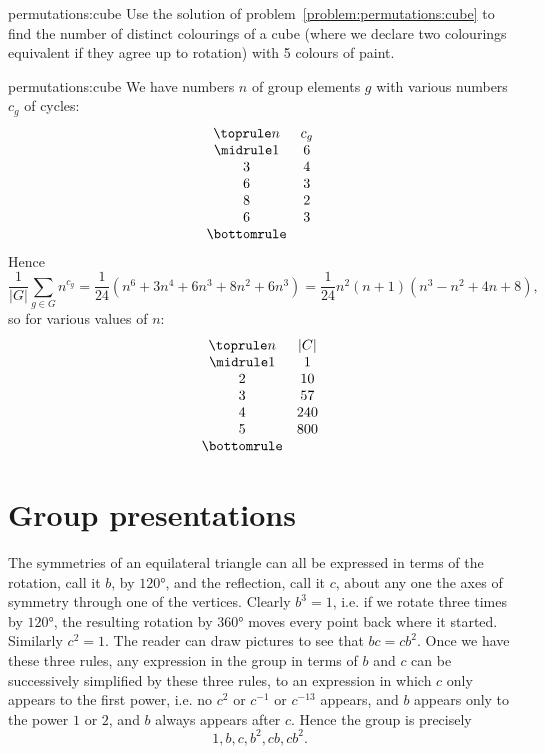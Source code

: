 \begin{problem}{permutations:cube}
Use the solution of problem~\vref{problem:permutations:cube} to find the number of distinct colourings of a cube (where we declare two colourings equivalent if they agree up to rotation) with 5 colours of paint.
\end{problem}
\begin{answer}{permutations:cube}
We have numbers \(n\) of group elements \(g\) with various numbers \(c_g\) of cycles:
\[
\begin{array}{cc}
\toprule
n & c_g\\
\midrule
1 & 6\\
3 & 4\\
6 & 3\\
8 & 2\\
6 & 3\\
\bottomrule
\end{array}
\]
Hence 
\[
\frac{1}{|G|} \sum_{g \in G} n^{c_g} 
= 
\frac{1}{24} (n^6 + 3n^4 + 6n^3+8n^2+6n^3)=\frac{1}{24}n^2(n+1)(n^3-n^2+4n+8),
\]
so for various values of \(n\):
\[
\begin{array}{cc}
\toprule
n & |C| \\
\midrule
1 & 1\\
2 & 10\\
3 & 57\\
4 & 240\\
5 & 800\\
\bottomrule
\end{array}
\]
\end{answer}


\section{Group presentations}

\begin{example}
The symmetries of an equilateral triangle can all be expressed in terms of the rotation, call it \(b\), by \(120\si{\degree}\), and the reflection, call it \(c\), about any one the axes of symmetry through one of the vertices.
Clearly \(b^3=1\), i.e. if we rotate three times by \(120\si{\degree}\), the resulting rotation by \(360\si{\degree}\) moves every point back where it started.
Similarly \(c^2=1\).
The reader can draw pictures to see that \(bc=cb^2\).
Once we have these three rules, any expression in the group in terms of \(b\) and \(c\) can be successively simplified by these three rules, to an expression in which \(c\) only appears to the first power, i.e. no \(c^2\) or \(c^{-1}\) or \(c^{-13}\) appears, and \(b\) appears only to the power \(1\) or \(2\), and \(b\) always appears after \(c\).
Hence the group is precisely
\[
1,b,c,b^2,cb,cb^2.
\]
\end{example}


